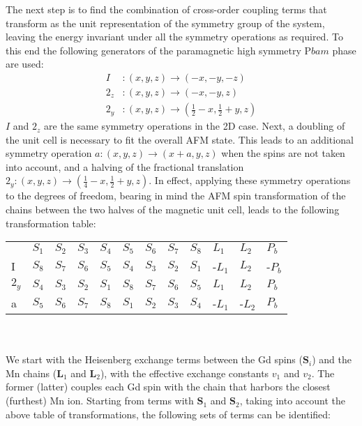 The next step is to find the combination of cross-order coupling terms that transform as the unit representation of the symmetry group of the system, leaving the energy invariant under all the symmetry operations as required.
To this end the following generators of the paramagnetic high symmetry P$bam$ phase are used:
\begin{align}
	I &: (x, y, z) \rightarrow (-x, -y, -z)\\
	2_z &: (x, y, z) \rightarrow (-x, -y, z)\\
	2_y &: (x, y, z) \rightarrow (\frac{1}{2} - x, \frac{1}{2} + y, z)
\end{align}
$I$ and $2_z$ are the same symmetry operations in the 2D case. Next, a doubling of the unit cell is necessary to fit the overall AFM state. This leads to an additional symmetry operation $a: (x, y, z) \rightarrow (x + a, y, z)$ when the spins are not taken into account, and a halving of the fractional translation $2_y: (x, y, z) \rightarrow (\frac{1}{4} - x, \frac{1}{2}+y, z)$.
In effect, applying these symmetry operations to the degrees of freedom, bearing in mind the AFM spin transformation of the chains between the two halves of the magnetic unit cell, leads to the following transformation table:
\begin{table}[h]
\centering
\begin{tabular}{|l|lllllllllll|}
\cline{1-12}
 & $S_1$ & $S_2$ & $S_3$ & $S_4$ & $S_5$ & $S_6$ & $S_7$ & $S_8$ & $L_1$ & $L_2$ & $P_b$ \\ \cline{1-12}
I & $S_8$ & $S_7$ & $S_6$ & $S_5$ & $S_4$ & $S_3$ & $S_2$ & $S_1$ & -$L_1$ & $L_2$ & -$P_b$ \\ \cline{1-12}
$2_y$ & $S_4$ & $S_3$ & $S_2$ & $S_1$ & $S_8$ & $S_7$ & $S_6$ & $S_5$ & $L_1$ & $L_2$ & $P_b$ \\ \cline{1-12}
a & $S_5$ & $S_6$ & $S_7$ & $S_8$ & $S_1$ & $S_2$ & $S_3$ & $S_4$ & -$L_1$ & -$L_2$ & $P_b$ \\ \cline{1-12}
\end{tabular}
\end{table}\\\\
We start with the Heisenberg exchange terms between the Gd spins ($\mathbf{S}_i$) and the Mn chains ($\mathbf{L}_1$ and $\mathbf{L}_2$), with the effective exchange constants $v_1$ and $v_2$.
The former (latter) couples each Gd spin with the chain that harbors the closest (furthest) Mn ion.
Starting from terms with $\mathbf{S}_1$ and $\mathbf{S}_2$, taking into account the above table of transformations, the following sets of terms can be identified:
